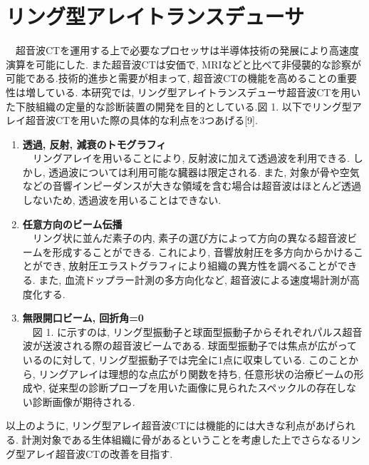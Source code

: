 \section{リング型アレイトランスデューサ} 
　超音波CTを運用する上で必要なプロセッサは半導体技術の発展により高速度演算を可能にした. また超音波CTは安価で, MRIなどと比べて非侵襲的な診察が可能である.技術的進歩と需要が相まって, 超音波CTの機能を高めることの重要性は増している.  本研究では, リング型アレイトランスデューサ超音波CTを用いた下肢組織の定量的な診断装置の開発を目的としている.図 1. 以下でリング型アレイ超音波CTを用いた際の具体的な利点を3つあげる[9].
\begin{enumerate}
\item{\bf 透過, 反射, 減衰のトモグラフィ}
\\\ \ リングアレイを用いることにより, 反射波に加えて透過波を利用できる. しかし, 透過波については利用可能な臓器は限定される. また, 対象が骨や空気などの音響インピーダンスが大きな領域を含む場合は超音波はほとんど透過しないため, 透過波を用いることはできない. 
\item{\bf 任意方向のビーム伝播}
\\\ \ リング状に並んだ素子の内, 素子の選び方によって方向の異なる超音波ビームを形成することができる. これにより, 音響放射圧を多方向からかけることができ, 放射圧エラストグラフィにより組織の異方性を調べることができる. また, 血流ドップラー計測の多方向化など, 超音波による速度場計測が高度化する. 
\item{\bf 無限開口ビーム, 回折角=0}
\\\ \ 図 1. に示すのは, リング型振動子と球面型振動子からそれぞれパルス超音波が送波される際の超音波ビームである. 球面型振動子では焦点が広がっているのに対して, リング型振動子では完全に1点に収束している. このことから, リングアレイは理想的な点広がり関数を持ち, 任意形状の治療ビームの形成や, 従来型の診断プローブを用いた画像に見られたスペックルの存在しない診断画像が期待される. 
\end{enumerate} 
以上のように, リング型アレイ超音波CTには機能的には大きな利点があげられる.  計測対象である生体組織に骨があるということを考慮した上でさらなるリング型アレイ超音波CTの改善を目指す. 

